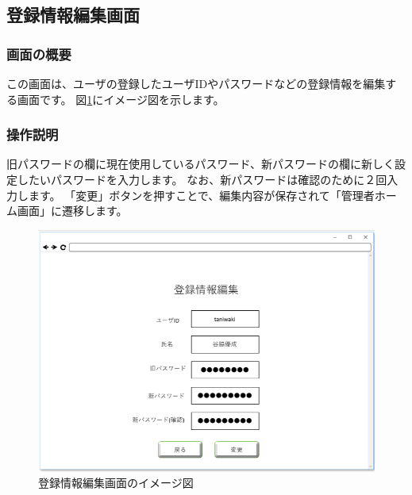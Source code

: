 
\newpage

\subsection{登録情報編集画面}
\subsubsection{画面の概要}
この画面は、ユーザの登録したユーザIDやパスワードなどの登録情報を編集する画面です。
図\ref{fig:06}にイメージ図を示します。

\subsubsection{操作説明}
旧パスワードの欄に現在使用しているパスワード、新パスワードの欄に新しく設定したいパスワードを入力します。
なお、新パスワードは確認のために２回入力します。
「変更」ボタンを押すことで、編集内容が保存されて「管理者ホーム画面」に遷移します。

\begin{figure}[htbp]
  \begin{center}
    \includegraphics[width=0.75\linewidth,clip]{./img/06.png}
    \caption{登録情報編集画面のイメージ図}\label{fig:06}
  \end{center}
\end{figure}

